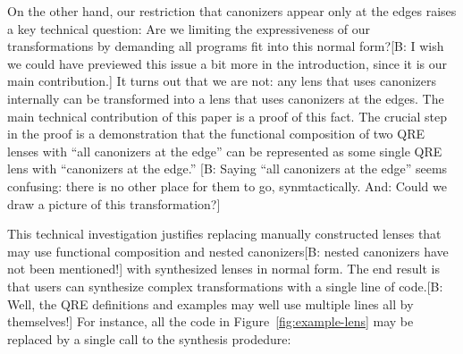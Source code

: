 \documentclass[acmsmall,review,anonymous]{acmart}
\newcommand{\FINISH}[3]{\ifdraft\textcolor{#1}{[#2: #3]}\fi}
\newcommand{\bcp}[1]{\FINISH{dkred}{B}{#1}}
\newcommand{\sam}[1]{\FINISH{dkpurple}{SM}{#1}}
\newcommand{\bibtex}{\textsc{Bib}\TeX{}}
\newcommand{\cd}[1]{\lstinline[backgroundcolor=\color{white}]$#1$}
\begin{document}

On the other hand, our restriction that canonizers appear only at the edges
raises a key technical question:  Are we limiting the expressiveness of our transformations
by demanding all programs fit into this normal form?\bcp{I wish we could
  have previewed this issue a bit more in the introduction, since it is our
  main contribution.}  It turns out that we are not:
any lens that uses canonizers internally can be transformed into a lens that uses canonizers
at the edges.  The main technical contribution of this paper is a proof of this fact.  The
crucial step in the proof is a demonstration that the functional composition
of two QRE lenses with ``all canonizers at the edge'' can be represented as some
single QRE lens with ``canonizers at the edge.''  \bcp{Saying ``all
  canonizers at the edge'' seems confusing: there is no other place for them
to go, synmtactically.  And: Could we draw a picture of this transformation?}




This technical investigation justifies replacing manually constructed lenses that may use
functional composition and nested canonizers\bcp{nested canonizers have not
  been mentioned!} with synthesized lenses in normal form.
The end result is that users can synthesize complex transformations with a
single line of code.\bcp{Well, the QRE definitions and examples may well use
multiple lines all by themselves!}  For instance, all the code in Figure~\ref{fig:example-lens} may be replaced by
a single call to the synthesis prodedure:
\end{document}

